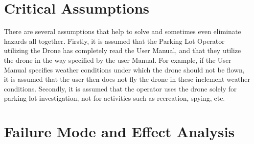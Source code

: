 \documentclass{article}
\begin{document}
\newpage


\section{Critical Assumptions}
There are several assumptions that help to solve and sometimes even eliminate hazards all together. Firstly, it is assumed that the Parking Lot Operator utilizing the Drone has completely read the User Manual, and that they utilize the drone in the way specified by the user Manual. For example, if the User Manual specifies weather conditions under which the drone should not be flown, it is assumed that the user then does not fly the drone in these inclement weather conditions. Secondly, it is assumed that the operator uses the drone solely for parking lot investigation, not for activities such as recreation, spying, etc.  


\section{Failure Mode and Effect Analysis}
\end{document}
